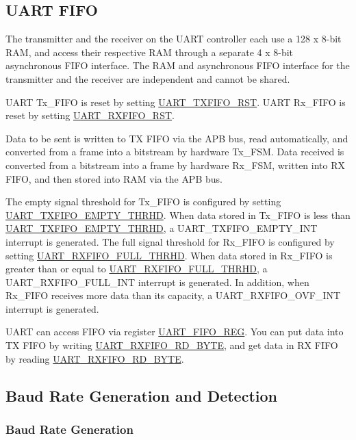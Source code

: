 \documentclass[main\_\_EN.tex]{subfiles}
\begin{document}
\subsection{UART FIFO}

The transmitter and the receiver on the UART controller each use a 128 x 8-bit RAM, and access their respective RAM through a separate 4 x 8-bit asynchronous FIFO interface. The RAM and asynchronous FIFO interface for the transmitter and the receiver are independent and cannot be shared.

UART Tx\_FIFO is reset by setting \hyperref[fielddesc:UARTTXFIFORST]{UART\_TXFIFO\_RST}. UART Rx\_FIFO is reset by setting \hyperref[fielddesc:UARTRXFIFORST]{UART\_RXFIFO\_RST}.

Data to be sent is written to TX FIFO via the APB bus, read automatically, and converted from a frame into a bitstream by hardware Tx\_FSM. Data received is converted from a bitstream into a frame by hardware Rx\_FSM, written into RX FIFO, and then stored into RAM via the APB bus.

The empty signal threshold for Tx\_FIFO is configured by setting \hyperref[fielddesc:UARTTXFIFOEMPTYTHRHD]{UART\_TXFIFO\_EMPTY\_THRHD}. When data stored in Tx\_FIFO is less than \hyperref[fielddesc:UARTTXFIFOEMPTYTHRHD]{UART\_TXFIFO\_EMPTY\_THRHD}, a UART\_TXFIFO\_EMPTY\_INT interrupt is generated. The full signal threshold for Rx\_FIFO is configured by setting \hyperref[fielddesc:UARTRXFIFOFULLTHRHD]{UART\_RXFIFO\_FULL\_THRHD}. When data stored in Rx\_FIFO is greater than or equal to \hyperref[fielddesc:UARTRXFIFOFULLTHRHD]{UART\_RXFIFO\_FULL\_THRHD}, a UART\_RXFIFO\_FULL\_INT interrupt is generated. In addition, when Rx\_FIFO receives more data than its capacity, a UART\_RXFIFO\_OVF\_INT interrupt is generated.

UART can access FIFO via register \hyperref[regdesc:UARTFIFOREG]{UART\_FIFO\_REG}. You can put data into TX FIFO by writing \hyperref[fielddesc:UARTRXFIFORDBYTE]{UART\_RXFIFO\_RD\_BYTE}, and get data in RX FIFO by reading \hyperref[fielddesc:UARTRXFIFORDBYTE]{UART\_RXFIFO\_RD\_BYTE}.

\subsection{Baud Rate Generation and Detection}

\subsubsection{Baud Rate Generation}
\end{document}
